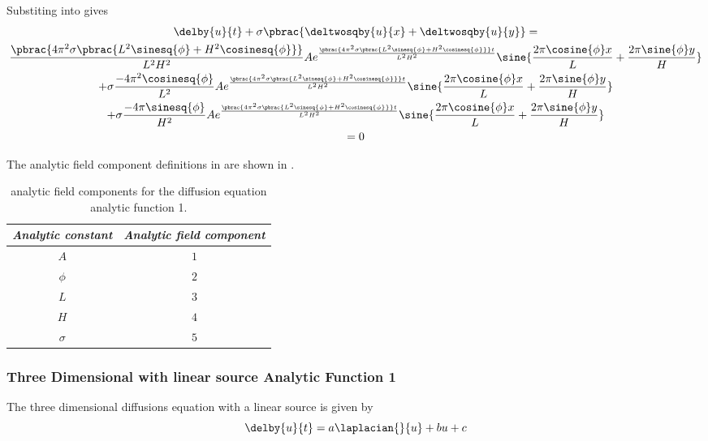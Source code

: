 Substiting
into  gives
\begin{multline}
  \delby{u}{t}+\sigma\pbrac{\deltwosqby{u}{x}+\deltwosqby{u}{y}} =\\
  \frac{\pbrac{4\pi^{2}\sigma\pbrac{L^{2}\sinesq{\phi}+H^{2}\cosinesq{\phi}}}}{L^{2}H^{2}}
  Ae^{\frac{\pbrac{4\pi^{2}\sigma\pbrac{L^{2}\sinesq{\phi}+H^{2}\cosinesq{\phi}}}t}{L^{2}H^{2}}}
  \sine{\dfrac{2\pi\cosine{\phi}x}{L}+\dfrac{2\pi\sine{\phi}y}{H}}\\
  +\sigma\dfrac{-4\pi^{2}\cosinesq{\phi}}{L^{2}}Ae^{\frac{\pbrac{4\pi^{2}\sigma\pbrac{L^{2}\sinesq{\phi}+H^{2}\cosinesq{\phi}}}t}{L^{2}H^{2}}}
  \sine{\dfrac{2\pi\cosine{\phi}x}{L}+\dfrac{2\pi\sine{\phi}y}{H}} \\
  +\sigma\dfrac{-4\pi\sinesq{\phi}}{H^{2}}Ae^{\frac{\pbrac{4\pi^{2}\sigma\pbrac{L^{2}\sinesq{\phi}+H^{2}\cosinesq{\phi}}}t}{L^{2}H^{2}}}
  \sine{\dfrac{2\pi\cosine{\phi}x}{L}+\dfrac{2\pi\sine{\phi}y}{H}} \\
  =0
\end{multline}


The analytic field component definitions in \OpenCMISS are shown in .

\begin{table}[htb] \centering
  \begin{tabular}{|c|c|} \hline
    \emph{Analytic constant} & \emph{Analytic field component} \\ \hline \hline
    $A$ & $1$ \\ 
    $\phi$ & $2$ \\
    $L$ & $3$ \\
    $H$ & $4$ \\ 
    $\sigma$ & $5$ \\ \hline
  \end{tabular}
  \caption{\OpenCMISS analytic field components for the \twod diffusion equation
    analytic function 1.}
  \label{tab:OpenCMISSAnalyticFieldDiffusionEquationTwoDim1}
\end{table}

\subsubsection{Three Dimensional with linear source Analytic Function 1}

The three dimensional diffusions equation with a linear source is given by
\begin{equation}
  \delby{u}{t}=a\laplacian{}{u}+bu+c
\end{equation}

